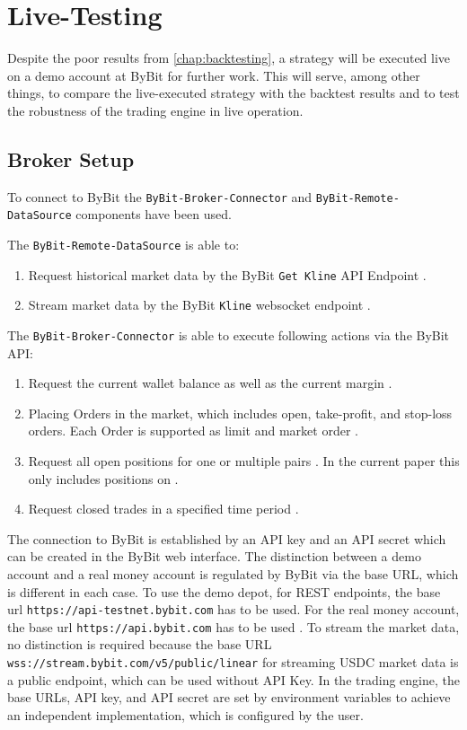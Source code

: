 \section{Live-Testing}

Despite the poor results from \autoref{chap:backtesting}, a strategy will be executed live on a demo account at ByBit for further work.
This will serve, among other things, to compare the live-executed strategy with the backtest results and to test the robustness of the trading engine in live operation.

\subsection{Broker Setup}

To connect to ByBit the \verb|ByBit-Broker-Connector| and \verb|ByBit-Remote-DataSource| components have been used.

The \verb|ByBit-Remote-DataSource| is able to:

\begin{enumerate}
    \item Request historical market data by the ByBit \texttt{Get Kline} API Endpoint \cite{get-kline}.
    \item Stream market data by the ByBit \texttt{Kline} websocket endpoint \cite{stream-kline}.
\end{enumerate}

The \verb|ByBit-Broker-Connector| is able to execute following actions via the ByBit API:

\begin{enumerate}
    \item Request the current wallet balance as well as the current margin \cite{wallet-balance}.
    \item Placing Orders in the market, which includes open, take-profit, and stop-loss orders. Each Order is supported as limit and market order \cite{place-order}.
    \item Request all open positions for one or multiple pairs \cite{position-info}. In the current paper this only includes positions on \ethusdc.
    \item Request closed trades in a specified time period \cite{closed-pnl}.
\end{enumerate}

The connection to ByBit is established by an API key and an API secret which can be created in the ByBit web interface.
The distinction between a demo account and a real money account is regulated by ByBit via the base URL, which is different in each case.
To use the demo depot, for REST endpoints, the base url \texttt{https://api-testnet.bybit.com} has to be used.
For the real money account, the base url \texttt{https://api.bybit.com} has to be used \cite{integration}.
To stream the market data, no distinction is required because the base URL \texttt{wss://stream.bybit.com/v5/public/linear} \cite{ws-connect} for streaming USDC market data is a public endpoint, which can be used without API Key.
In the trading engine, the base URLs, API key, and API secret are set by environment variables to achieve an independent implementation, which is configured by the user.

